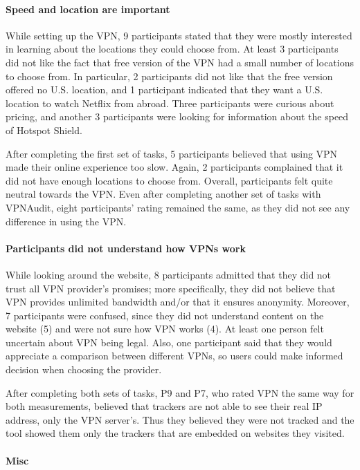 \paragraph{Speed and location are important}

While setting up the VPN, 9 participants stated that they were mostly interested in learning about the locations they could choose from. At least 3 participants did not like the fact that free version of the VPN had a small number of locations to choose
from. In particular, 2 participants did not like that the free version offered no U.S. location, and 1 participant indicated that they want a U.S. location to watch Netflix from abroad. Three participants were curious about pricing, and another 3 participants were looking for information about the speed of Hotspot Shield.

After completing the first set of tasks, 5 participants believed that using VPN made their online experience too
slow. Again, 2 participants complained that it did not have enough locations
to choose from. Overall, participants felt quite neutral towards the VPN.
Even after completing another set of tasks with VPNAudit, eight participants' rating remained the same, as they did not see any difference in using the VPN.

\paragraph{Participants did not understand how VPNs work}

While looking around the website, 8 participants admitted that they did not
trust all VPN provider's promises; more specifically, they did not believe
that VPN provides unlimited bandwidth and/or that it ensures anonymity.
Moreover, 7 participants were confused, since they did not understand content
on the website (5) and were not sure how VPN works (4). At least one person
felt uncertain about VPN being legal.  Also, one participant said that
they would appreciate a comparison between different VPNs, so users could make
informed decision when choosing the provider.

After completing both sets of tasks, P9 and P7, who rated VPN the same way for both
measurements, believed that trackers are not able to see their real IP
address, only the VPN server’s. Thus they believed they were not tracked and
the tool showed them only the trackers that are embedded on websites they
visited. 

\paragraph{Misc} 

